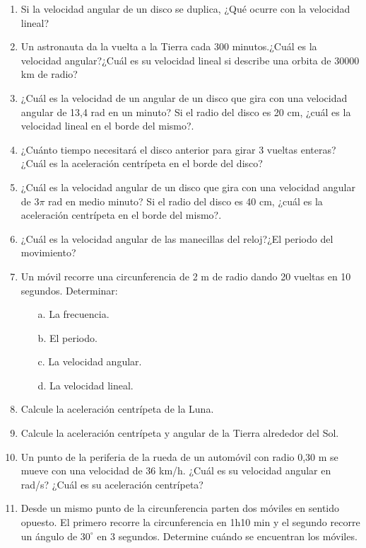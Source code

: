 \begin{enumerate}
\item  Si la velocidad angular de un disco se duplica, ¿Qué ocurre con la velocidad lineal?
 
\item Un astronauta da la vuelta a la Tierra cada 300 minutos.¿Cuál es la velocidad angular?¿Cuál es su velocidad lineal si 
describe una orbita de 30000 km de radio?

\item ¿Cuál es la velocidad de un angular de un disco que gira con una velocidad angular de 13,4 rad en un minuto? Si el radio 
del disco es 20 cm, ¿cuál es la velocidad lineal en el borde del mismo?.

\item ¿Cuánto tiempo necesitará el disco anterior para girar 3 vueltas enteras?¿Cuál es la aceleración centrípeta en el borde del 
disco?

\item ¿Cuál es la velocidad angular de un disco que gira con una velocidad angular de $3\pi$ rad en medio minuto? Si el radio del 
disco es 40 cm, ¿cuál es la aceleración centrípeta en el borde del mismo?.

\item ¿Cuál es la velocidad angular de las manecillas del reloj?¿El periodo del movimiento?

\item Un móvil recorre una circunferencia de 2 m de radio dando 20 vueltas en 10 segundos. Determinar:

\begin{itemize}
 \item [a.] La frecuencia.
 \item [b.] El periodo.
 \item [c.] La velocidad angular.
 \item [d.] La velocidad lineal.
\end{itemize}

\item Calcule la aceleración centrípeta de la   Luna.

\item Calcule la aceleración centrípeta y angular de la Tierra alrededor del Sol.

\item  Un punto de la periferia de la rueda de un automóvil con radio 0,30 m se mueve con una velocidad de 36 km/h. ¿Cuál es su 
velocidad angular en rad/s? ¿Cuál es su aceleración centrípeta?

\item Desde un mismo punto de la circunferencia parten dos móviles en sentido opuesto. El primero recorre la circunferencia en 
1h10 min y el segundo recorre un ángulo de $30^\circ$ en 3 segundos. Determine cuándo se encuentran los móviles.

\end{enumerate}



